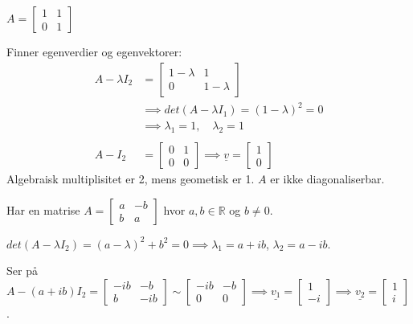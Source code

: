 \documentclass[11pt, a4paper, norsk]{article}
\begin{document}
        \begin{Example}{}{}
            $A = \begin{bmatrix}
                1 & 1 \\
                0 & 1
            \end{bmatrix}$

            Finner egenverdier og egenvektorer:
            \begin{align*}
                A - \lambda I_{2} &= \begin{bmatrix}
                    1 - \lambda & 1 \\
                    0 & 1 - \lambda
                \end{bmatrix}
                \\
                                  &\implies det(A - \lambda I_1) = (1-\lambda)^2 = 0
                                  \\
                                  &\implies \lambda_1 = 1, \quad \lambda_2 = 1
                                  \\
                                  \\
                    A - I_2 &= \begin{bmatrix}
                        0 & 1 \\
                        0 & 0
                    \end{bmatrix} \implies \underline{v} = \begin{bmatrix}
                        1 \\
                        0
                    \end{bmatrix}
            \end{align*}
            Algebraisk multiplisitet er 2, mens geometisk er 1. $A$ er ikke diagonaliserbar.
        \end{Example}


        Har en matrise $A = \begin{bmatrix}
            a & -b \\
            b & a
        \end{bmatrix}$ hvor $a, b \in \mathbb{R}$ og $b \neq 0$.

        $det(A - \lambda I_{2}) = (a-\lambda)^2 + b^2 = 0 \implies \lambda_1 = a+ib$, $\lambda_2 = a - ib$.

        Ser på $A - (a+ib)I_{2} = \begin{bmatrix}
            -ib & -b \\
            b & -ib
        \end{bmatrix} \sim \begin{bmatrix}
            -ib & -b \\
            0 & 0
        \end{bmatrix} \implies \underline{v_1} = \begin{bmatrix}
            1 \\
            -i
        \end{bmatrix} \implies \underline{v_2} = \begin{bmatrix}
            1 \\
            i
        \end{bmatrix}$.
\end{document}
